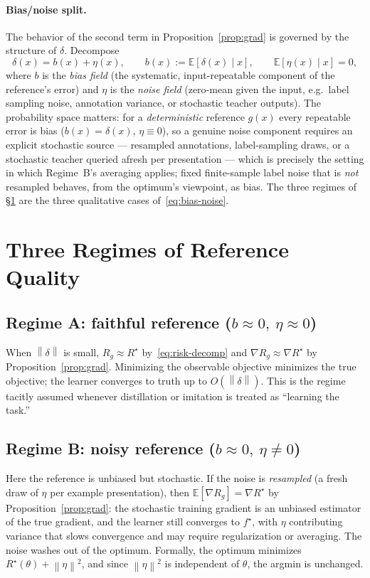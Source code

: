 \documentclass[10pt]{article} %
\theoremstyle{plain}
\theoremstyle{remark}
\newcommand{\E}{\mathbb{E}}
\newcommand{\fstar}{f^{\star}}
\newcommand{\norm}[1]{\left\lVert #1 \right\rVert}
\begin{document}
\paragraph{Bias/noise split.} The behavior of the second term in Proposition~\ref{prop:grad} is governed by the structure of $\delta$. Decompose
\begin{equation}
\delta(x) = b(x) + \eta(x), \qquad b(x) := \E[\delta(x)\mid x], \qquad \E[\eta(x)\mid x] = 0,
\label{eq:bias-noise}
\end{equation}
where $b$ is the \emph{bias field} (the systematic, input-repeatable component of the reference's error) and $\eta$ is the \emph{noise field} (zero-mean given the input, e.g.\ label sampling noise, annotation variance, or stochastic teacher outputs). The probability space matters: for a \emph{deterministic} reference $g(x)$ every repeatable error is bias ($b(x)=\delta(x)$, $\eta\equiv0$), so a genuine noise component requires an explicit stochastic source --- resampled annotations, label-sampling draws, or a stochastic teacher queried afresh per presentation --- which is precisely the setting in which Regime~B's averaging applies; fixed finite-sample label noise that is \emph{not} resampled behaves, from the optimum's viewpoint, as bias. The three regimes of \S\ref{sec:regimes} are the three qualitative cases of~\eqref{eq:bias-noise}.

\section{Three Regimes of Reference Quality}
\label{sec:regimes}

\subsection{Regime A: faithful reference ($b\approx 0,\ \eta\approx 0$)}
When $\norm{\delta}$ is small, $R_g \approx R^\star$ by~\eqref{eq:risk-decomp} and $\nabla R_g \approx \nabla R^\star$ by Proposition~\ref{prop:grad}. Minimizing the observable objective minimizes the true objective; the learner converges to truth up to $O(\norm{\delta})$. This is the regime tacitly assumed whenever distillation or imitation is treated as ``learning the task.''

\subsection{Regime B: noisy reference ($b\approx 0,\ \eta\neq 0$)}
Here the reference is unbiased but stochastic. If the noise is \emph{resampled} (a fresh draw of $\eta$ per example presentation), then $\E[\nabla R_g] = \nabla R^\star$ by Proposition~\ref{prop:grad}: the stochastic training gradient is an unbiased estimator of the true gradient, and the learner still converges to $\fstar$, with $\eta$ contributing variance that slows convergence and may require regularization or averaging. The noise washes out of the optimum. Formally, the optimum minimizes $R^\star(\theta) + \norm{\eta}^2$, and since $\norm{\eta}^2$ is independent of $\theta$, the argmin is unchanged.
\end{document}
